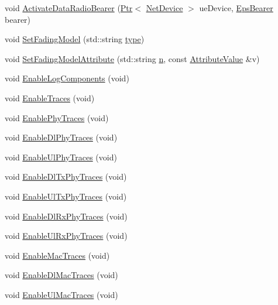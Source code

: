 \begin{DoxyCompactItemize}
\item 
void \hyperlink{classns3_1_1LteHelper_a93de068f676cc2ad235df74d23ecb54e}{Activate\+Data\+Radio\+Bearer} (\hyperlink{classns3_1_1Ptr}{Ptr}$<$ \hyperlink{classns3_1_1NetDevice}{Net\+Device} $>$ ue\+Device, \hyperlink{structns3_1_1EpsBearer}{Eps\+Bearer} bearer)
\item 
void \hyperlink{classns3_1_1LteHelper_a36b39e1d4a50f4647e81967685ac62ff}{Set\+Fading\+Model} (std\+::string \hyperlink{visualizer-ideas_8txt_add98db9e15e2a58cf2b57623e7aa893a}{type})
\item 
void \hyperlink{classns3_1_1LteHelper_aedbe5aa68544779474f27d32e4470ada}{Set\+Fading\+Model\+Attribute} (std\+::string \hyperlink{lte__link__budget__x2__handover__measures_8m_abdb05bc5a064cf642a06c83b3392f148}{n}, const \hyperlink{classns3_1_1AttributeValue}{Attribute\+Value} \&v)
\item 
void \hyperlink{classns3_1_1LteHelper_a1f84fe303e7c737d911c52f529e53abe}{Enable\+Log\+Components} (void)
\item 
void \hyperlink{classns3_1_1LteHelper_aeb70fd96f1c58806a5b7ad9f68a795e0}{Enable\+Traces} (void)
\item 
void \hyperlink{classns3_1_1LteHelper_ad6d7edf234d29f7b8363e9ebf73fe32e}{Enable\+Phy\+Traces} (void)
\item 
void \hyperlink{classns3_1_1LteHelper_a91567fa5345ff8d69ab03f45042ba74d}{Enable\+Dl\+Phy\+Traces} (void)
\item 
void \hyperlink{classns3_1_1LteHelper_a054448bb5bd549f61462fc124578049c}{Enable\+Ul\+Phy\+Traces} (void)
\item 
void \hyperlink{classns3_1_1LteHelper_afa42502e6f341da865811bf3cd5ef88b}{Enable\+Dl\+Tx\+Phy\+Traces} (void)
\item 
void \hyperlink{classns3_1_1LteHelper_a2c414741c73a9dd125fe2a7b3a63ad3a}{Enable\+Ul\+Tx\+Phy\+Traces} (void)
\item 
void \hyperlink{classns3_1_1LteHelper_add3b1208816547494f766ba3564a2ca9}{Enable\+Dl\+Rx\+Phy\+Traces} (void)
\item 
void \hyperlink{classns3_1_1LteHelper_ab7c507ee3d1bdd916b0250b974751cef}{Enable\+Ul\+Rx\+Phy\+Traces} (void)
\item 
void \hyperlink{classns3_1_1LteHelper_affa3a12841520407d3662417fe41863d}{Enable\+Mac\+Traces} (void)
\item 
void \hyperlink{classns3_1_1LteHelper_aca02df5d8852bf9721b1541707dcd84f}{Enable\+Dl\+Mac\+Traces} (void)
\item 
void \hyperlink{classns3_1_1LteHelper_ad6d528e87c4f4089fc2679f31b2c90ff}{Enable\+Ul\+Mac\+Traces} (void)

\end{DoxyCompactItemize}
